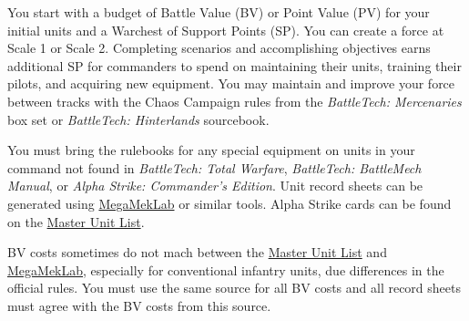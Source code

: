 You start with a budget of Battle Value (BV) or Point Value (PV) for your initial units and a Warchest of Support Points (SP).
You can create a force at Scale 1 or Scale 2.
Completing scenarios and accomplishing objectives earns additional SP for commanders to spend on maintaining their units, training their pilots, and acquiring new equipment.
You may maintain and improve your force between tracks with the Chaos Campaign rules from the \emph{BattleTech: Mercenaries} box set or \emph{BattleTech: Hinterlands} sourcebook.

You must bring the rulebooks for any special equipment on units in your command not found in \emph{BattleTech: Total Warfare}, \emph{BattleTech: BattleMech Manual}, or \emph{Alpha Strike: Commander's Edition}.
Unit record sheets can be generated using \href{https://megamek.org}{MegaMekLab} or similar tools.
Alpha Strike cards can be found on the \href{http://www.masterunitlist.info}{Master Unit List}.

BV costs sometimes do not mach between the \href{http://www.masterunitlist.info}{Master Unit List} and \href{https://megamek.org}{MegaMekLab}, especially for conventional infantry units, due differences in the official rules.
You must use the same source for all BV costs and all record sheets must agree with the BV costs from this source.

